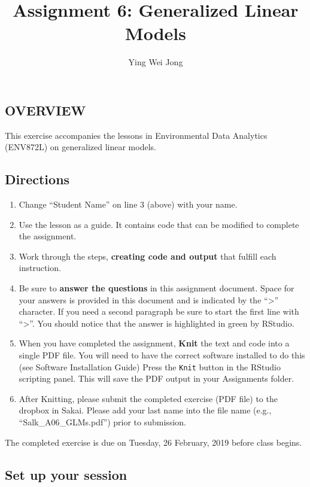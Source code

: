 \documentclass[]{article}
\title{Assignment 6: Generalized Linear Models}
\author{Ying Wei Jong}
\date{}
\providecommand{\tightlist}{%
  \setlength{\itemsep}{0pt}\setlength{\parskip}{0pt}}
\begin{document}
\maketitle

\subsection{OVERVIEW}\label{overview}

This exercise accompanies the lessons in Environmental Data Analytics
(ENV872L) on generalized linear models.

\subsection{Directions}\label{directions}

\begin{enumerate}
\def\labelenumi{\arabic{enumi}.}
\tightlist
\item
  Change ``Student Name'' on line 3 (above) with your name.
\item
  Use the lesson as a guide. It contains code that can be modified to
  complete the assignment.
\item
  Work through the steps, \textbf{creating code and output} that fulfill
  each instruction.
\item
  Be sure to \textbf{answer the questions} in this assignment document.
  Space for your answers is provided in this document and is indicated
  by the ``\textgreater{}'' character. If you need a second paragraph be
  sure to start the first line with ``\textgreater{}''. You should
  notice that the answer is highlighted in green by RStudio.
\item
  When you have completed the assignment, \textbf{Knit} the text and
  code into a single PDF file. You will need to have the correct
  software installed to do this (see Software Installation Guide) Press
  the \texttt{Knit} button in the RStudio scripting panel. This will
  save the PDF output in your Assignments folder.
\item
  After Knitting, please submit the completed exercise (PDF file) to the
  dropbox in Sakai. Please add your last name into the file name (e.g.,
  ``Salk\_A06\_GLMs.pdf'') prior to submission.
\end{enumerate}

The completed exercise is due on Tuesday, 26 February, 2019 before class
begins.

\subsection{Set up your session}\label{set-up-your-session}
\end{document}
